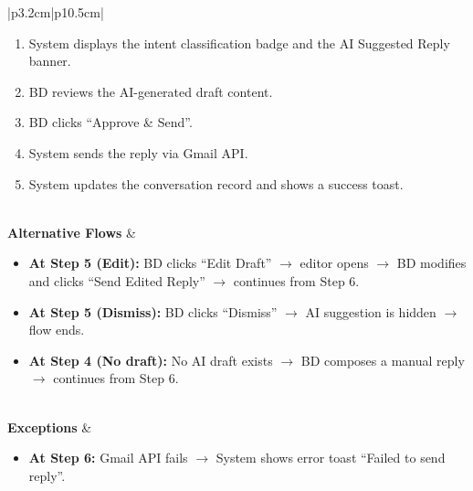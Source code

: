 \documentclass[a4paper]{article}
\begin{document}
\begin{table}[H]
\begin{tabular}{|p{3.2cm}|p{10.5cm}|}
\begin{minipage}[t]{\linewidth}
\begin{enumerate}[nosep,leftmargin=*]
  \item System displays the intent classification badge and the 
  AI Suggested Reply banner.
  \item BD reviews the AI-generated draft content.
  \item BD clicks ``Approve \& Send''.
  \item System sends the reply via Gmail API.
  \item System updates the conversation record and shows a 
  success toast.
\end{enumerate}
\end{minipage} \\
\hline
\textbf{Alternative Flows} &
\begin{minipage}[t]{\linewidth}
\begin{itemize}[nosep,leftmargin=*]
  \item \textbf{At Step 5 (Edit):} BD clicks ``Edit Draft'' 
  $\rightarrow$ editor opens $\rightarrow$ BD modifies and clicks 
  ``Send Edited Reply'' $\rightarrow$ continues from Step 6.
  \item \textbf{At Step 5 (Dismiss):} BD clicks ``Dismiss'' 
  $\rightarrow$ AI suggestion is hidden $\rightarrow$ flow ends.
  \item \textbf{At Step 4 (No draft):} No AI draft exists 
  $\rightarrow$ BD composes a manual reply $\rightarrow$ continues 
  from Step 6.
\end{itemize}
\end{minipage} \\
\hline
\textbf{Exceptions} &
\begin{minipage}[t]{\linewidth}
\begin{itemize}[nosep,leftmargin=*]
  \item \textbf{At Step 6:} Gmail API fails $\rightarrow$ System 
  shows error toast ``Failed to send reply''.
\end{itemize}
\end{minipage} \\
\hline
\end{tabular}
\end{table}
\end{document}
